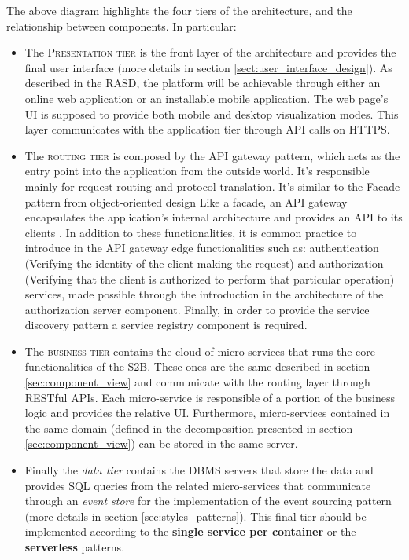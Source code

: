 The above diagram highlights the four tiers of the architecture, and the relationship between components. In particular:
\begin{itemize}
    \item The \textsc{Presentation tier} is the front layer of the architecture and provides the final user interface (more details in section \ref{sect:user_interface_design}). As described in the RASD, the platform will be achievable through either an online web application or an installable mobile application. The web page's UI is supposed to provide both mobile and desktop visualization modes. This layer communicates with the application tier through API calls on HTTPS.
    \item The \textsc{routing tier} is composed by the API gateway pattern, which acts as the entry point into the application from the outside world. It’s responsible mainly for request routing and protocol translation. It’s similar to the Facade pattern from object-oriented design Like a facade, an API gateway encapsulates the application’s internal architecture and provides an API to its clients \cite{richardson2018microservices}. In addition to these functionalities, it is common practice to introduce in the API gateway edge functionalities such as: authentication (Verifying the identity of the client making the request) and authorization (Verifying that the client is authorized to perform that particular operation) services, made possible through the introduction in the architecture of the authorization server component. Finally, in order to provide the service discovery pattern a service registry component is required.
    \item The \textsc{business tier} contains the cloud of micro-services that runs the core functionalities of the S2B. These ones are the same described in section \ref{sec:component_view} and communicate with the routing layer through RESTful APIs. Each micro-service is responsible of a portion of the business logic and provides the relative UI. Furthermore, micro-services contained in the same domain (defined in the decomposition presented in section \ref{sec:component_view}) can be stored in the same server.
    \item Finally the \textit{data tier} contains the DBMS servers that store the data and provides SQL queries from the related micro-services that communicate through an \textit{event store} for the implementation of the event sourcing pattern (more details in section \ref{sec:styles_patterns}). This final tier should be implemented according to the \textbf{single service per container} or the \textbf{serverless} patterns.
\end{itemize}
